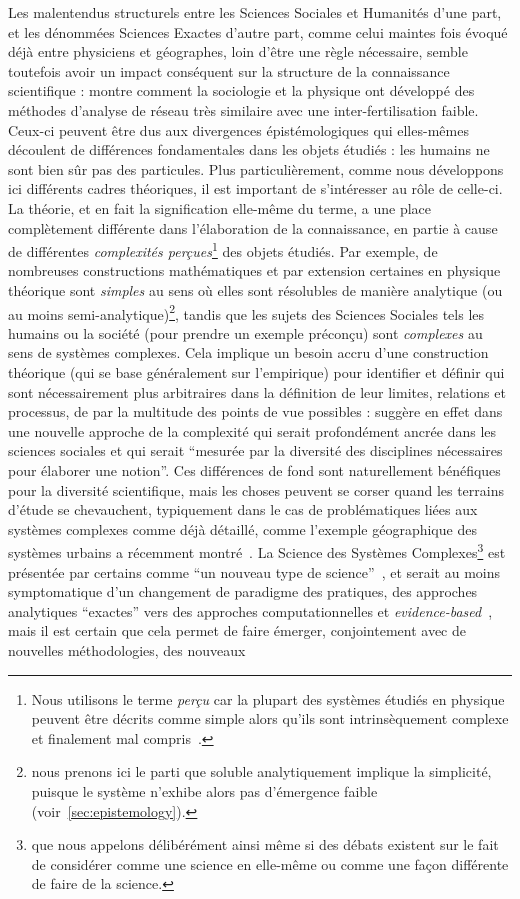 {}{
Les malentendus structurels entre les Sciences Sociales et Humanités d'une part, et les dénommées Sciences Exactes d'autre part, comme celui maintes fois évoqué déjà entre physiciens et géographes, loin d'être une règle nécessaire, semble toutefois avoir un impact conséquent sur la structure de la connaissance scientifique : \cite{2015arXiv151103981H} montre comment la sociologie et la physique ont développé des méthodes d'analyse de réseau très similaire avec une inter-fertilisation faible. Ceux-ci peuvent être dus aux divergences épistémologiques qui elles-mêmes découlent de différences fondamentales dans les objets étudiés : les humains ne sont bien sûr pas des particules. Plus particulièrement, comme nous développons ici différents cadres théoriques, il est important de s'intéresser au rôle de celle-ci. La théorie, et en fait la signification elle-même du terme, a une place complètement différente dans l'élaboration de la connaissance, en partie à cause de différentes \emph{complexités perçues}\footnote{Nous utilisons le terme \emph{perçu} car la plupart des systèmes étudiés en physique peuvent être décrits comme simple alors qu'ils sont intrinsèquement complexe et finalement mal compris~\cite{laughlin2006different}.} des objets étudiés. Par exemple, de nombreuses constructions mathématiques et par extension certaines en physique théorique sont \emph{simples} au sens où elles sont résolubles de manière analytique (ou au moins semi-analytique)\footnote{nous prenons ici le parti que soluble analytiquement implique la simplicité, puisque le système n'exhibe alors pas d'émergence faible (voir~\ref{sec:epistemology}).}, tandis que les sujets des Sciences Sociales tels les humains ou la société (pour prendre un exemple préconçu) sont \emph{complexes} au sens de systèmes complexes. Cela implique un besoin accru d'une construction théorique (qui se base généralement sur l'empirique) pour identifier et définir qui sont nécessairement plus arbitraires dans la définition de leur limites, relations et processus, de par la multitude des points de vue possibles :  suggère en effet dans~\cite{pumain2005cumulativite} une nouvelle approche de la complexité qui serait profondément ancrée dans les sciences sociales et qui serait ``mesurée par la diversité des disciplines nécessaires pour élaborer une notion''. Ces différences de fond sont naturellement bénéfiques pour la diversité scientifique, mais les choses peuvent se corser quand les terrains d'étude se chevauchent, typiquement dans le cas de problématiques liées aux systèmes complexes comme déjà détaillé, comme l'exemple géographique des systèmes urbains a récemment montré~\cite{dupuy2015sciences}. La Science des Systèmes Complexes\footnote{que nous appelons délibérément ainsi même si des débats existent sur le fait de considérer comme une science en elle-même ou comme une façon différente de faire de la science.} est présentée par certains comme ``un nouveau type de science''~\cite{wolfram2002new}, et serait au moins symptomatique d'un changement de paradigme des pratiques, des approches analytiques ``exactes'' vers des approches computationnelles et \emph{evidence-based}~\cite{arthur2015complexity}, mais il est certain que cela permet de faire émerger, conjointement avec de nouvelles méthodologies, des nouveaux }
